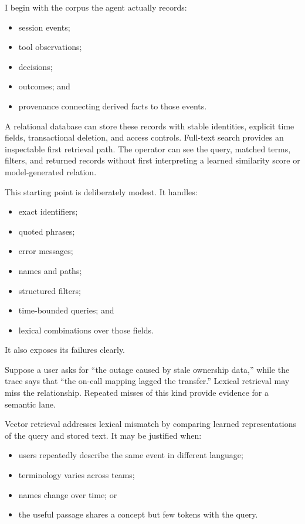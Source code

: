 I begin with the corpus the agent actually records:

\begin{itemize}
\tightlist
\item
  session events;
\item
  tool observations;
\item
  decisions;
\item
  outcomes; and
\item
  provenance connecting derived facts to those events.
\end{itemize}

A relational database can store these records with stable identities, explicit time fields, transactional deletion, and access controls. Full-text search provides an inspectable first retrieval path. The operator can see the query, matched terms, filters, and returned records without first interpreting a learned similarity score or model-generated relation.

This starting point is deliberately modest. It handles:

\begin{itemize}
\tightlist
\item
  exact identifiers;
\item
  quoted phrases;
\item
  error messages;
\item
  names and paths;
\item
  structured filters;
\item
  time-bounded queries; and
\item
  lexical combinations over those fields.
\end{itemize}

It also exposes its failures clearly.

Suppose a user asks for ``the outage caused by stale ownership data,'' while the trace says that ``the on-call mapping lagged the transfer.'' Lexical retrieval may miss the relationship. Repeated misses of this kind provide evidence for a semantic lane.

Vector retrieval addresses lexical mismatch by comparing learned representations of the query and stored text. It may be justified when:

\begin{itemize}
\tightlist
\item
  users repeatedly describe the same event in different language;
\item
  terminology varies across teams;
\item
  names change over time; or
\item
  the useful passage shares a concept but few tokens with the query.
\end{itemize}

